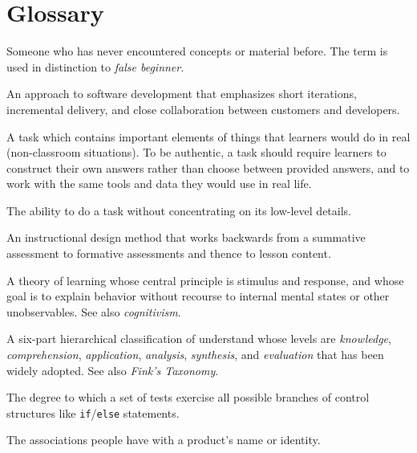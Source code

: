 \chapter{Glossary}\label{s:gloss}

\begin{description}


 Someone who has
never encountered concepts or material before.  The term is used
in distinction to \emph{false beginner}.

 An approach to
software development that emphasizes short iterations, incremental
delivery, and close collaboration between customers and developers.

 A task which contains
important elements of things that learners would do in real
(non-classroom situations). To be authentic, a task should require
learners to construct their own answers rather than choose between
provided answers, and to work with the same tools and data they would
use in real life.

 The ability to do a task
without concentrating on its low-level details.


 An instructional design
method that works backwards from a summative assessment to formative
assessments and thence to lesson content.

 A theory of learning whose
central principle is stimulus and response, and whose goal is to
explain behavior without recourse to internal mental states or other
unobservables. See also \emph{cognitivism}.

 A six-part hierarchical
classification of understand whose levels are \emph{knowledge},
\emph{comprehension}, \emph{application}, \emph{analysis},
\emph{synthesis}, and \emph{evaluation} that has been widely
adopted. See also \emph{Fink's Taxonomy}.

 The degree to which a
set of tests exercise all possible branches of control structures like
\texttt{if}/\texttt{else} statements.

 The associations people have with a
product's name or identity.


\end{description}
